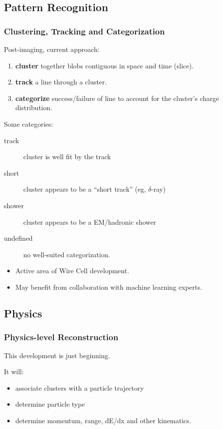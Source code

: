 \documentclass[xcolor=dvipsnames]{beamer}
\begin{document}
\subsection{Pattern Recognition}

\begin{frame}
  \frametitle{Clustering, Tracking and Categorization}
  Post-imaging, current approach:
  \begin{enumerate}
  \item \textbf{cluster} together blobs contiguous in space and time
    (slice).
  \item \textbf{track} a line through a cluster.
  \item \textbf{categorize} success/failure of line to account for the
    cluster's charge distribution.
  \end{enumerate}
  Some categories:
  \begin{description}
  \item[track] cluster is well fit by the track
  \item[short] cluster appears to be a ``short track'' (eg, $\delta$-ray)
  \item[shower] cluster appears to be a EM/hadronic shower
  \item[undefined] no well-suited categorization.
  \end{description}

  \begin{itemize}
  \item Active area of Wire Cell development.
  \item May benefit from collaboration with machine learning experts. 
  \end{itemize}

\end{frame}

\subsection{Physics}
\begin{frame}
  \frametitle{Physics-level Reconstruction}

  This development is just beginning.
  
  It will:
  \begin{itemize}
  \item associate clusters with a particle trajectory
  \item determine particle type
  \item determine momentum, range, dE/dx and other kinematics.
  \end{itemize}

\end{frame}
\end{document}
